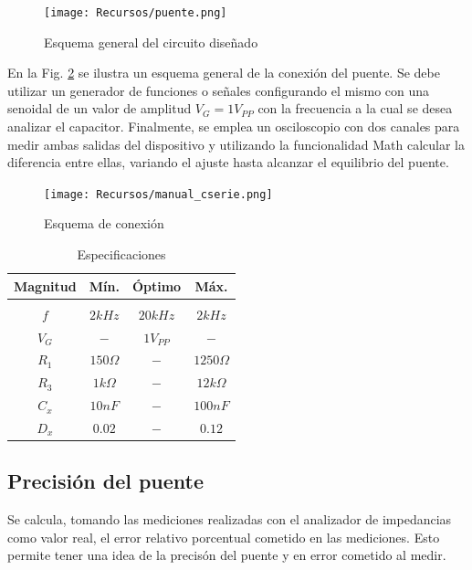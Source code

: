 \begin{figure}[H]
    \centering
    \texttt{[image: Recursos/puente.png]}
    \caption{Esquema general del circuito dise\~nado}
    \label{fig:circuito_puente_final}
\end{figure}

En la Fig. \ref{fig:conexion_puente} se ilustra un esquema general de la conexi\'on del puente. Se debe utilizar un generador de funciones o se\~nales configurando el mismo con una senoidal de un valor de amplitud $V_G = 1 V_{PP}$ con la frecuencia a la cual se desea analizar el capacitor. Finalmente, se emplea un osciloscopio con dos canales para medir ambas salidas del dispositivo y utilizando la funcionalidad Math calcular la diferencia entre ellas, variando el ajuste hasta alcanzar el equilibrio del puente.

\begin{figure}[H]
    \centering
    \texttt{[image: Recursos/manual\_cserie.png]}
    \caption{Esquema de conexi\'on}
    \label{fig:conexion_puente}
\end{figure}

\begin{table}[H]
    \centering
    \begin{tabular}{c | c c c}
        Magnitud & M\'in. & \'Optimo & M\'ax. \\
        \hline \\
        $f$ & $2kHz$ & $20kHz$ & $2kHz$ \\
        $V_G$ & $-$ & $1 V_{PP}$ & $-$ \\
        $R_1$ & $150 \Omega$ & $-$ & $1250 \Omega$ \\
        $R_3$ & $1k \Omega$ & $-$ & $12k \Omega$ \\
        $C_x$ & $10nF$ & $-$ & $100nF$ \\
        $D_x$ & $0.02$ & $-$ & $0.12$ \\
        \hline
    \end{tabular}
    \caption{Especificaciones}
    \label{tab:especificaciones}
\end{table}

\subsection{Precisi\'on del puente}
Se calcula, tomando las mediciones realizadas con el analizador de impedancias como valor real, el error relativo porcentual cometido en las mediciones. Esto permite tener una idea de la precis\'on del puente y en error cometido al medir.

